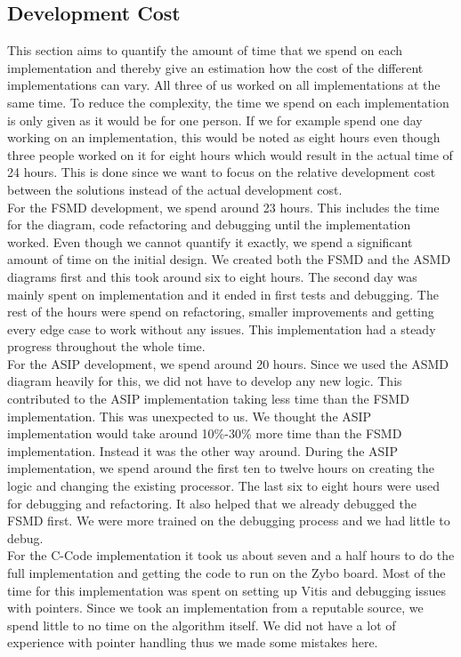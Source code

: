 \documentclass[conference]{IEEEtran}
\begin{document}
\subsection{Development Cost} \label{sec:devcost}
This section aims to quantify the amount of time that we spend on each implementation and thereby give an estimation how the cost of the different implementations can vary. All three of us worked on all implementations at the same time. To reduce the complexity, the time we spend on each implementation is only given as it would be for one person. If we for example spend one day working on an implementation, this would be noted as eight hours even though three people worked on it for eight hours which would result in the actual time of 24 hours. This is done since we want to focus on the relative development cost between the solutions instead of the actual development cost.\\
For the FSMD development, we spend around 23 hours. This includes the time for the diagram, code refactoring and debugging until the implementation worked. Even though we cannot quantify it exactly, we spend a significant amount of time on the initial design. We created both the FSMD and the ASMD diagrams first and this took around six to eight hours. The second day was mainly spent on implementation and it ended in first tests and debugging. The rest of the hours were spend on refactoring, smaller improvements and getting every edge case to work without any issues. This implementation had a steady progress throughout the whole time.\\
For the ASIP development, we spend around 20 hours. Since we used the ASMD diagram heavily for this, we did not have to develop any new logic. This contributed to the ASIP implementation taking less time than the FSMD implementation. This was unexpected to us. We thought the ASIP implementation would take around 10\%-30\% more time than the FSMD implementation. Instead it was the other way around. During the ASIP implementation, we spend around the first ten to twelve hours on creating the logic and changing the existing processor. The last six to eight hours were used for debugging and refactoring. It also helped that we already debugged the FSMD first. We were more trained on the debugging process and we had little to debug. \\
For the C-Code implementation it took us about seven and a half hours to do the full implementation and getting the code to run on the Zybo board. Most of the time for this implementation was spent on setting up Vitis and debugging issues with pointers. Since we took an implementation from a reputable source, we spend little to no time on the algorithm itself. We did not have a lot of experience with pointer handling thus we made some mistakes here.\\
\end{document}
